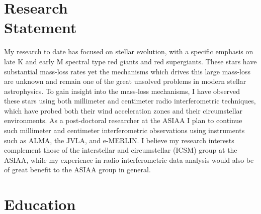 \documentclass[margin,line]{resume}
\begin{document}
\begin{resume}
    \section{\mysidestyle Research\\Statement} 
My research to date has focused on stellar evolution, with a specific emphasis on late K and early M spectral type red giants and red supergiants. These stars have substantial mass-loss rates yet the mechanisms which drives this large mass-loss are unknown and remain one of the great unsolved problems in modern stellar astrophysics. To gain insight into the mass-loss mechanisms, I have observed these stars using both millimeter and centimeter radio interferometric techniques, which have probed both their wind acceleration zones and their circumstellar environments. As a post-doctoral researcher at the ASIAA I plan to continue such millimeter and centimeter interferometric observations using instruments such as ALMA, the JVLA, and e-MERLIN. I believe my research interests complement those of the  interstellar and circumstellar (ICSM) group at the ASIAA, while my experience in radio interferometric data analysis would also be of great benefit to the ASIAA group in general.


    \vspace{2mm}
    \section{\mysidestyle Education}


\end{resume}
\end{document}
